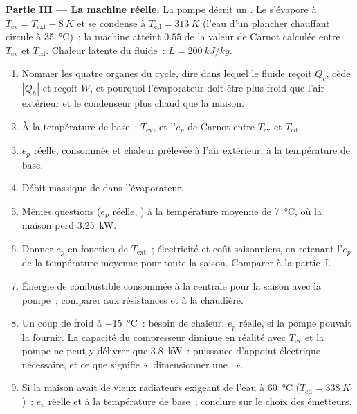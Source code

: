 \begin{problem}
\medskip
\noindent\textbf{Partie III --- La machine réelle.}
La pompe décrit un . Le 
s'évapore à $T_{\mathrm{ev}} = T_{\mathrm{ext}} - \qty{8}{K}$ et se condense à
$T_{\mathrm{cd}} = \qty{313}{K}$ (l'eau d'un plancher chauffant circule à
\qty{35}{\degreeCelsius})~; la machine atteint $0.55$ de la valeur de Carnot
calculée entre $T_{\mathrm{ev}}$ et $T_{\mathrm{cd}}$. Chaleur latente du
fluide~: $L = \qty{200}{kJ/kg}$.
\begin{enumerate}[resume]
  \item Nommer les quatre organes du cycle, dire dans lequel le fluide
        reçoit $Q_c$, cède $|Q_h|$ et reçoit $W$, et pourquoi l'évaporateur
        doit être plus froid que l'air extérieur et le condenseur plus
        chaud que la maison.
  \item À la température de base~: $T_{\mathrm{ev}}$, et l'$e_p$ de Carnot
        entre $T_{\mathrm{ev}}$ et $T_{\mathrm{cd}}$.
  \item $e_p$ réelle,  consommée et chaleur prélevée à
        l'air extérieur, à la température de base.
  \item Débit massique de  dans l'évaporateur.
  \item Mêmes questions ($e_p$ réelle, ) à la
        température moyenne de \qty{7}{\degreeCelsius}, où la maison perd
        \qty{3.25}{kW}.
  \item Donner $e_p$ en fonction de $T_{\mathrm{ext}}$~; électricité et coût
        saisonniers, en retenant l'$e_p$ de la température moyenne pour
        toute la saison. Comparer à la partie~I.
  \item Énergie de combustible consommée à la centrale pour la saison avec
        la pompe~; comparer aux résistances et à la chaudière.
  \item Un coup de froid à \qty{-15}{\degreeCelsius}~: besoin de chaleur,
        $e_p$ réelle,  si la pompe pouvait la fournir.
        La capacité du compresseur diminue en réalité avec $T_{\mathrm{ev}}$
        et la pompe ne peut y délivrer que \qty{3.8}{kW}~: puissance
        d'appoint électrique nécessaire, et ce que signifie «~dimensionner
        une ~».
  \item Si la maison avait de vieux radiateurs exigeant de l'eau à
        \qty{60}{\degreeCelsius} ($T_{\mathrm{cd}} = \qty{338}{K}$)~: $e_p$
        réelle et  à la température de base~; conclure
        sur le choix des émetteurs.
\end{enumerate}


\end{problem}
